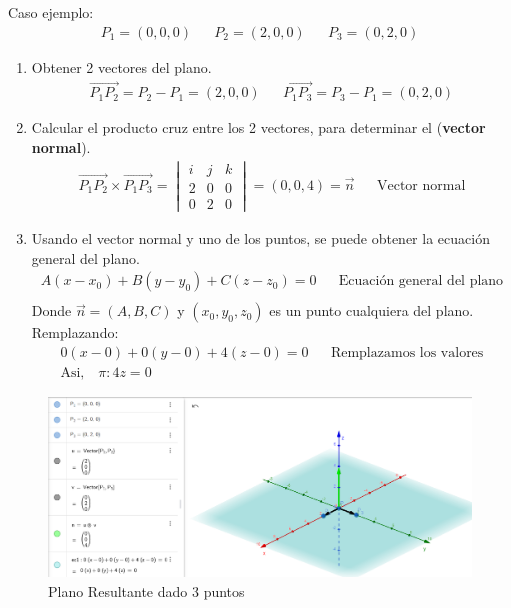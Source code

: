 \documentclass{templateNote}
\begin{document}
Caso ejemplo:
\begin{align*}
    P_1 = (0, 0, 0) &&
    P_2 = (2, 0, 0) &&
    P_3 = (0, 2, 0)
\end{align*}
\begin{enumerate}
    \item Obtener 2 vectores del plano.
    \begin{align*}
        \overrightarrow{P_1P_2} = P_2 - P_1 = (2, 0, 0) &&
        \overrightarrow{P_1P_3} = P_3 - P_1 = (0, 2, 0)
    \end{align*}
    
    \item Calcular el producto cruz entre los 2 vectores, para determinar el (\textbf{vector normal}).
    \begin{align*}
        \overrightarrow{P_1P_2} \times \overrightarrow{P_1P_3} =  \begin{vmatrix} i & j & k \\ 2 & 0 & 0 \\ 0 & 2 & 0\end{vmatrix} = (0, 0, 4)  = \overrightarrow{n}&& \text{Vector normal}
    \end{align*}
    
    \item Usando el vector normal y uno de los puntos, se puede obtener la ecuación general del plano.
    \begin{align*}
        A(x-x_0) + B(y-y_0) + C(z-z_0) = 0 && \text{Ecuación general del plano} \\
    \end{align*}
    Donde $\overrightarrow{n} = (A, B, C)$ y $(x_0, y_0, z_0)$ es un punto cualquiera del plano.
    Remplazando:
    \begin{align*}
        0(x-0) + 0(y-0) + 4(z-0) = 0 && \text{Remplazamos los valores} \\
        \textrm{Asi,} \quad \pi: 4z = 0
    \end{align*}
\end{enumerate}

\begin{figure}[H]
    \centering
    \includegraphics[width=\linewidth]{img/PlanoResultanteDado3Puntos.png}
    \caption{Plano Resultante dado 3 puntos}
\end{figure}
\newpage
\end{document}
